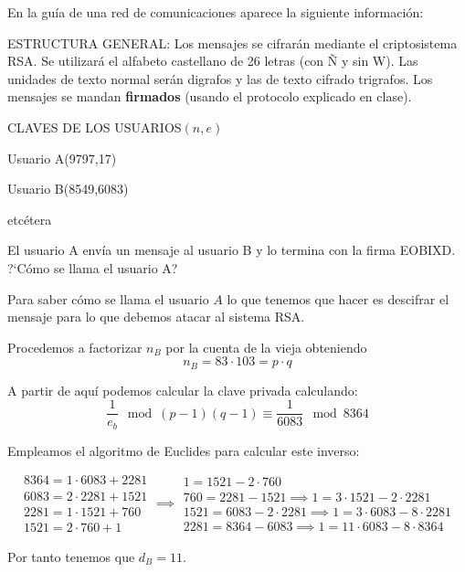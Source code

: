 \begin{problem}[4]
En la guía de una red de comunicaciones aparece la
siguiente información:

ESTRUCTURA GENERAL: Los mensajes se cifrarán mediante el
criptosistema RSA. Se utilizará el alfabeto castellano de 26
letras (con Ñ y sin W). Las unidades de texto normal serán
digrafos y las de texto cifrado trigrafos. Los mensajes se mandan
{\bf firmados} (usando el protocolo explicado en clase).

 CLAVES DE LOS
USUARIOS\dotfill$(n,e)$\hphantom{(9797,17)(8549,6083)}

Usuario A\dotfill(9797,17)\hphantom{$(n,e)$(8549,6083)}

Usuario B\dotfill(8549,6083)\hphantom{(9797,17)$(n,e)$}

etcétera
\vspace{2mm}


  El usuario A envía un mensaje al usuario B y lo termina con
la firma EOBIXD. ?`Cómo se llama el usuario A?
\solution


Para saber cómo se llama el usuario $A$ lo que tenemos que hacer es descifrar el mensaje para lo que debemos atacar al sistema RSA.

Procedemos a factorizar $n_B$ por la cuenta de la vieja obteniendo
\[n_B= 83 \cdot 103 = p \cdot q\]

A partir de aquí podemos calcular la clave privada calculando:
\[\frac{1}{e_b} \mod (p-1)(q-1) \equiv \frac{1}{6083} \mod 8364\]

Empleamos el algoritmo de Euclides para calcular este inverso:

\[
\begin{array}{l}
8364 = 1 \cdot 6083 + 2281 \\
6083 = 2\cdot 2281 + 1521 \\
2281 = 1\cdot 1521 + 760 \\
1521 = 2 \cdot 760 + 1
\end{array} \implies \begin{array}{l}
1 = 1521 -2\cdot 760 \\
760 = 2281 - 1521 \implies 1 = 3\cdot 1521 -2\cdot 2281 \\
1521 = 6083 - 2\cdot 2281 \implies 1 = 3 \cdot 6083 -8 \cdot 2281 \\
2281 = 8364 - 6083 \implies 1 = 11 \cdot 6083 - 8 \cdot 8364
\end{array}
\]

Por tanto tenemos que $d_B=11$.


\end{problem}
